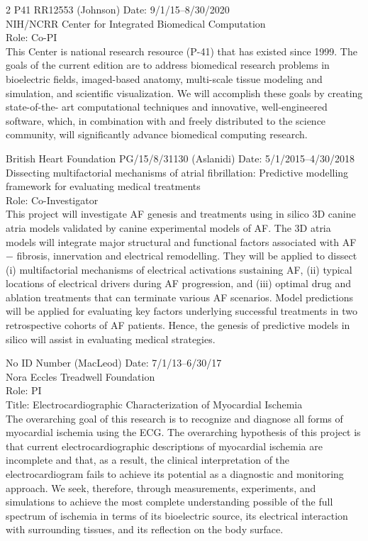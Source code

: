 \documentclass[10pt]{article}
\begin{document}
\noindent
\parbox{\columnwidth}{
2 P41 RR12553 (Johnson) Date: 9/1/15--8/30/2020\\
NIH/NCRR Center for Integrated Biomedical Computation\\
Role: Co-PI \\
This Center is national research resource (P-41) that has existed since
1999. The goals of the current edition are to address biomedical research
problems in bioelectric fields, imaged-based anatomy, multi-scale tissue
modeling and simulation, and scientific visualization. We will accomplish
these goals by creating state-of-the- art computational techniques and
innovative, well-engineered software, which, in combination with and freely
distributed to the science community, will significantly advance biomedical
computing research.}


\medskip

\noindent
\parbox{\columnwidth}{
  British Heart Foundation PG/15/8/31130 (Aslanidi) Date:
  5/1/2015--4/30/2018\\ 
  Dissecting multifactorial mechanisms of atrial fibrillation: Predictive
  modelling framework for evaluating medical treatments \\
  Role: Co-Investigator \\
  This project will investigate AF genesis and treatments using in silico
  3D canine atria models validated by canine experimental models of AF. The
  3D atria models will integrate major structural and functional factors
  associated with AF − fibrosis, innervation and electrical
  remodelling. They will be applied to dissect (i) multifactorial
  mechanisms of electrical activations sustaining AF, (ii) typical
  locations of electrical drivers during AF progression, and (iii) optimal
  drug and ablation treatments that can terminate various AF
  scenarios. Model predictions will be applied for evaluating key factors
  underlying successful treatments in two retrospective cohorts of AF
  patients. Hence, the genesis of predictive models in silico will assist
  in evaluating medical strategies.}


\medskip

\noindent
\parbox{\columnwidth}{
No ID Number (MacLeod)  Date: 7/1/13--6/30/17\\
Nora Eccles Treadwell Foundation \\
Role: PI\\
Title: Electrocardiographic Characterization of Myocardial Ischemia \\
The overarching goal of this research is to recognize and diagnose all
forms of myocardial ischemia using the ECG.  The overarching hypothesis of
this project is that current electrocardiographic descriptions of
myocardial ischemia are incomplete and that, as a result, the clinical
interpretation of the electrocardiogram fails to achieve its potential as a
diagnostic and monitoring approach.  We seek, therefore, through
measurements, experiments, and simulations to achieve the most complete
understanding possible of the full spectrum of ischemia in terms of its
bioelectric source, its electrical interaction with surrounding tissues,
and its reflection on the body surface.}
\end{document}
